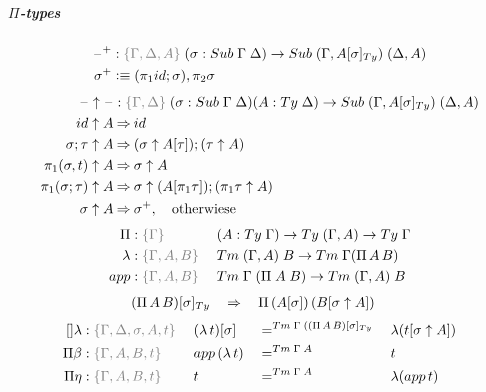 \documentclass[a4paper,UKenglish,numberwithinsect,cleveref,thm-restate]{lipics-v2021}
\begin{document}
\subparagraph*{$\Pi$-types}
\begin{alignat*}{5}
  \blank^+ & : \implicit{\Gamma, \Delta, A}\; (\sigma : \Sub\;\Gamma\;\Delta) \to \Sub\;(\Gamma, \subTy{A}{\sigma})\;(\Delta, A) \\
  \sigma^+ & \defeq (\pi_1\idS; \sigma), \pi_2\sigma
\end{alignat*}
\begin{alignat*}{5}
  \blank\uparrow\blank & : \implicit{\Gamma, \Delta}\;(\sigma : \Sub\;\Gamma\;\Delta) (A : \Ty\;\Delta) \to \Sub\;(\Gamma, \subTy{A}{\sigma})\;(\Delta, A) \\
\idS                \uparrow A  & \reduce \idS \\
\sigma ; \tau       \uparrow A  & \reduce (\sigma \uparrow \sub{A}{\tau}) ; (\tau \uparrow A) \\
\pi_1(\sigma, t)    \uparrow A  & \reduce \sigma \uparrow A \\
\pi_1(\sigma; \tau) \uparrow A  & \reduce \sigma \uparrow (\sub{A}{\pi_1 \tau}) ; (\pi_1 \tau \uparrow A) \\
\sigma              \uparrow A  & \reduce \sigma^+,\quad  \text{otherwiese}
\end{alignat*}
\begin{alignat*}{5}
  \Pi             & : \implicit{\Gamma}\; && (A : \Ty\;\Gamma) \to \Ty\;(\Gamma, A) \to \Ty\;\Gamma \\
  \lambda         &: \implicit{\Gamma, A, B} \; && \Tm\;(\Gamma, A)\;B \to \Tm\;\Gamma(\Pi\,A\,B) \\
  \mathsf{app}    &: \implicit{\Gamma, A, B} \; && \Tm\;\Gamma\;(\Pi\;A\;B) \to \Tm\;(\Gamma, A)\;B
\end{alignat*}
\begin{alignat*}{3}
  & \subTy{(\Pi\,A\,B)}{\sigma}       && {} \reduce {} && \Pi\,(\sub{A}{\sigma})\,(\sub{B}{\sigma\uparrow A})
\end{alignat*}
\begin{alignat*}{5}
  []\lambda       & : \implicit{\Gamma, \Delta, \sigma, A, t}\;&& \sub{(\lambda\,t)}{\sigma} && {} =^{\Tm\;\Gamma\;(\subTy{(\Pi\,A\,B)}{\sigma}} {} && \lambda (\sub{t}{\sigma \uparrow A}) \\
  \Pi\beta        & : \implicit{\Gamma, A, B, t}\; && \mathsf{app}\,(\lambda\,t)            && =^{\Tm\;\Gamma\;A} && t \\
  \Pi\eta         & : \implicit{\Gamma, A, B, t}\; && t                                     && =^{\Tm\;\Gamma\;A} && \lambda(\mathsf{app}\,t)
\end{alignat*}
\end{document}

